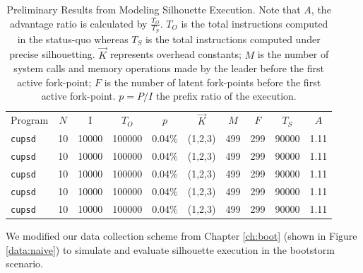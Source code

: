 \begin{table}[h]
  \caption{\hspace{0.2in}Preliminary Results from Modeling Silhouette Execution. \newline \newline 
  Note that $A$, the advantage ratio is calculated by $\frac{T_O}{T_S}$.
  $T_O$ is the total instructions computed in the status-quo whereas $T_S$ is the total instructions computed under
  precise silhouetting. $\vec K$ represents overhead constants; $M$ is the number
  of system calls and memory operations made by the leader before the first active fork-point; $F$
  is the number of latent fork-points before the first active fork-point. $p = P/I$
  the prefix ratio of the execution. }
\label{ps:inittbl}
\begin{center}
\begin{tabular}{|l||c|c||c||c|c|c|c||c||c|}\hline
  Program & $N$ & I & $T_O$ & $p$ & $\vec K$ & $M$ & $F$ & $T_S$ & $A$ \\
  \texttt{cupsd} & 10 & 10000 & 100000 & 0.04\% & (1,2,3) & 499 & 299 & 90000 & 1.11  \\\hline
  \texttt{cupsd} & 10 & 10000 & 100000 & 0.04\% & (1,2,3) & 499 & 299 & 90000 & 1.11  \\\hline
  \texttt{cupsd} & 10 & 10000 & 100000 & 0.04\% & (1,2,3) & 499 & 299 & 90000 & 1.11  \\\hline
  \texttt{cupsd} & 10 & 10000 & 100000 & 0.04\% & (1,2,3) & 499 & 299 & 90000 & 1.11  \\\hline
  \texttt{cupsd} & 10 & 10000 & 100000 & 0.04\% & (1,2,3) & 499 & 299 & 90000 & 1.11  \\\hline
\end{tabular}
\end{center}
\end{table}











We modified our data collection scheme from Chapter \ref{ch:boot} 
(shown in Figure \ref{data:naive}) to simulate and
evaluate silhouette execution in the bootstorm scenario.



